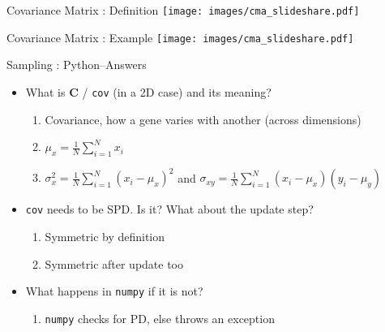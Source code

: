 \documentclass[presentation]{beamer}
\newcommand{\bv}[1]{\ensuremath{\mathbf{#1}}}
\begin{document}
\begin{frame}[label={sec:org21ac520}]{Covariance Matrix : Definition}
\texttt{[image: images/cma\_slideshare.pdf]}
\end{frame}
\begin{frame}[label={sec:org8d5a0b8}]{Covariance Matrix : Example}
\texttt{[image: images/cma\_slideshare.pdf]}
\end{frame}
\begin{frame}[label={sec:org18d2830},fragile]{Sampling : Python--Answers}
 \begin{itemize}
\item What is \(\bv{C}\) / \texttt{cov} (in a 2D case) and its meaning?
\begin{enumerate}
\item Covariance, how a gene varies with another (across dimensions)
\item \(\mu_x = \frac{1}{N} \sum_{i=1}^{N}x_i\)
\item \(\sigma_x^2 = \frac{1}{N} \sum_{i=1}^{N}(x_i - \mu_x)^2\) and \(\sigma_{xy} = \frac{1}{N} \sum_{i=1}^{N}(x_i - \mu_x)(y_i - \mu_y)\)
\end{enumerate}
\item \texttt{cov} needs to be SPD. Is it? What about the update step?
\begin{enumerate}
\item Symmetric by definition
\item Symmetric after update too
\end{enumerate}
\item What happens in \texttt{numpy} if it is not?
\begin{enumerate}
\item \texttt{numpy} checks for PD, else throws an exception
\end{enumerate}
\end{itemize}
\end{frame}
\end{document}
